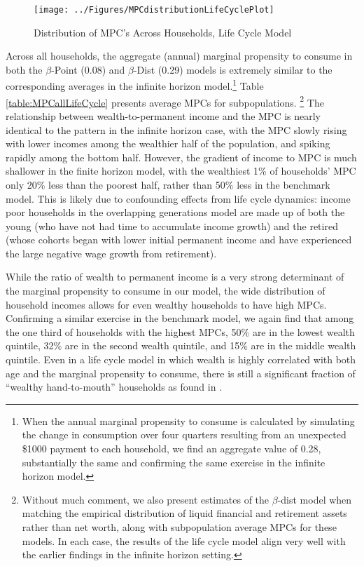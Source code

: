 \documentclass{econtex}\usepackage{graphicx} \usepackage{hyperref} \usepackage{ushort}
\newcommand{\Discount}{\ensuremath{\beta}}
\begin{document}
\begin{figure}
\caption{Distribution of MPC's Across Households, Life Cycle Model}
\begin{center}
\texttt{[image: ../Figures/MPCdistributionLifeCyclePlot]}
\end{center}
\end{figure}

Across all households, the aggregate (annual) marginal propensity to consume in both the \Discount-Point (0.08) and \Discount-Dist (0.29) models is extremely similar to the corresponding averages in the infinite horizon model.\footnote{When the annual marginal propensity to consume is calculated by simulating the change in consumption over four quarters resulting from an unexpected \$1000 payment to each household, we find an aggregate value of 0.28, substantially the same and confirming the same exercise in the infinite horizon model.}  Table \ref{table:MPCallLifeCycle} presents average MPCs for subpopulations.%
\footnote{Without much comment, we also present estimates of the \Discount-dist model when matching the empirical distribution of liquid financial and retirement assets rather than net worth, along with subpopulation average MPCs for these models.  In each case, the results of the life cycle model align very well with the earlier findings in the infinite horizon setting.}  The relationship between wealth-to-permanent income and the MPC is nearly identical to the pattern in the infinite horizon case, with the MPC slowly rising with lower incomes among the wealthier half of the population, and spiking rapidly among the bottom half.  However, the gradient of income to MPC is much shallower in the finite horizon model, with the wealthiest 1\% of households' MPC only 20\% less than the poorest half, rather than 50\% less in the benchmark model.  This is likely due to confounding effects from life cycle dynamics: income poor households in the overlapping generations model are made up of both the young (who have not had time to accumulate income growth) and the retired (whose cohorts began with lower initial permanent income and have experienced the large negative wage growth from retirement).

While the ratio of wealth to permanent income is a very strong determinant of the marginal propensity to consume in our model, the wide distribution of household incomes allows for even wealthy households to have high MPCs.  Confirming a similar exercise in the benchmark model, we again find that among the one third of households with the highest MPCs, 50\% are in the lowest wealth quintile, 32\% are in the second wealth quintile, and 15\% are in the middle wealth quintile.  Even in a life cycle model in which wealth is highly correlated with both age and the marginal propensity to consume, there is still a significant fraction of ``wealthy hand-to-mouth'' households as found in \cite{kaplanViolanteWeidner_wealthyH2M}.
\end{document}
